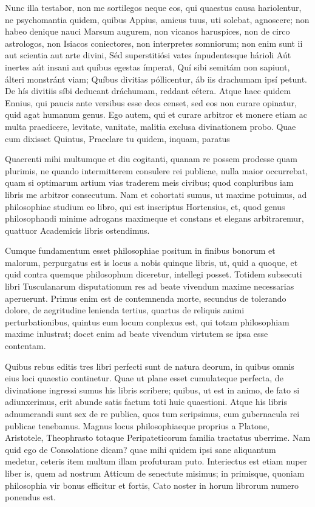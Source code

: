  Nunc illa testabor, non me sortilegos neque eos, qui quaestus causa hariolentur, ne psychomantia quidem, quibus Appius, amicus tuus, uti solebat, agnoscere; non habeo denique nauci Marsum augurem, non vicanos haruspices, non de circo astrologos, non Isiacos coniectores, non interpretes somniorum; non enim sunt ii aut scientia aut arte divini, Séd superstitiósi vates ínpudentesque hárioli Aút inertes aút insani aut quíbus egestas ímperat, Quí sibi semitám non sapiunt, álteri monstránt viam; Quíbus divitias póllicentur, áb iis drachumam ipsí petunt. De hís divitiis síbi deducant dráchumam, reddant cétera. Atque haec quidem Ennius, qui paucis ante versibus esse deos censet, sed eos non curare opinatur, quid agat humanum genus. Ego autem, qui et curare arbitror et monere etiam ac multa praedicere, levitate, vanitate, malitia exclusa divinationem probo. Quae cum dixisset Quintus, Praeclare tu quidem, inquam, paratus

 Quaerenti mihi multumque et diu cogitanti, quanam re possem prodesse quam plurimis, ne quando intermitterem consulere rei publicae, nulla maior occurrebat, quam si optimarum artium vias traderem meis civibus; quod conpluribus iam libris me arbitror consecutum. Nam et cohortati sumus, ut maxime potuimus, ad philosophiae studium eo libro, qui est inscriptus Hortensius, et, quod genus philosophandi minime adrogans maximeque et constans et elegans arbitraremur, quattuor Academicis libris ostendimus.

 Cumque fundamentum esset philosophiae positum in finibus bonorum et malorum, perpurgatus est is locus a nobis quinque libris, ut, quid a quoque, et quid contra quemque philosophum diceretur, intellegi posset. Totidem subsecuti libri Tusculanarum disputationum res ad beate vivendum maxime necessarias aperuerunt. Primus enim est de contemnenda morte, secundus de tolerando dolore, de aegritudine lenienda tertius, quartus de reliquis animi perturbationibus, quintus eum locum conplexus est, qui totam philosophiam maxime inlustrat; docet enim ad beate vivendum virtutem se ipsa esse contentam.

 Quibus rebus editis tres libri perfecti sunt de natura deorum, in quibus omnis eius loci quaestio continetur. Quae ut plane esset cumulateque perfecta, de divinatione ingressi sumus his libris scribere; quibus, ut est in animo, de fato si adiunxerimus, erit abunde satis factum toti huic quaestioni. Atque his libris adnumerandi sunt sex de re publica, quos tum scripsimus, cum gubernacula rei publicae tenebamus. Magnus locus philosophiaeque proprius a Platone, Aristotele, Theophrasto totaque Peripateticorum familia tractatus uberrime. Nam quid ego de Consolatione dicam? quae mihi quidem ipsi sane aliquantum medetur, ceteris item multum illam profuturam puto. Interiectus est etiam nuper liber is, quem ad nostrum Atticum de senectute misimus; in primisque, quoniam philosophia vir bonus efficitur et fortis, Cato noster in horum librorum numero ponendus est.

